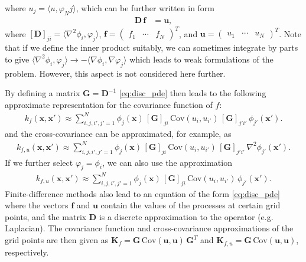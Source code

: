 \documentclass[journal]{IEEEtran}
\begin{document}
%
where $u_j = \langle u, \varphi_Nj\rangle$, which can be further written in form
%
\begin{equation}
\begin{split}
  \mathbf{D} \, \mathbf{f} &= \mathbf{u},
\end{split}
\label{eq:disc_pde}
\end{equation}
%
where $[\mathbf{D}]_{ji} = \langle \nabla^2 \phi_i, \varphi_j \rangle$, $\mathbf{f} = \begin{pmatrix} f_1 & \cdots & f_N \end{pmatrix}^T$, and $\mathbf{u} = \begin{pmatrix} u_1 & \cdots & u_N  \end{pmatrix}^T$. Note that if we define the inner product suitably, we can sometimes integrate by parts to give $\langle \nabla^2 \phi_i, \varphi_j \rangle \to -\langle \nabla \phi_i, \nabla \varphi_j \rangle$ which leads to weak formulations of the problem. However, this aspect is not considered here further.

By defining a matrix $\mathbf{G} = \mathbf{D}^{-1}$ \eqref{eq:disc_pde} then leads to the following approximate representation for the covariance function of $f$:
%
% 
% 
\begin{equation}
\begin{split}
  k_f(\mathbf{x},\mathbf{x}')
  \approx \sum_{i,j,i',j'=1}^N \phi_j(\mathbf{x}) \, [\mathbf{G}]_{ji} \, \mathrm{Cov}(u_i,u_{i'}) \, 
    [\mathbf{G}]_{j'i'} \, \phi_{j'}(\mathbf{x}').
\end{split}
\end{equation}
%
and the cross-covariance can be approximated, for example, as
%
\begin{equation}
\begin{split}
  k_{f,u}(\mathbf{x},\mathbf{x}')
  \approx \sum_{i,j,i',j'=1}^N \phi_j(\mathbf{x}) \, [\mathbf{G}]_{ji} \, \mathrm{Cov}(u_i,u_{i'}) \, 
    [\mathbf{G}]_{j'i'} \, \nabla^2 \phi_{j'}(\mathbf{x}').
\end{split}
\label{eq:pde_kfu}
\end{equation}
%
If we further select $\varphi_j = \phi_i$, we can also use the approximation
%
\begin{equation}
\begin{split}
  k_{f,u}(\mathbf{x},\mathbf{x}')
  \approx \sum_{i,j,i',j'=1}^N \phi_j(\mathbf{x}) \, [\mathbf{G}]_{ji} \, \mathrm{Cov}(u_i,u_{i'}) \, \phi_{j'}(\mathbf{x}').
\end{split}
\label{eq:pde_kfu2}
\end{equation}
%
Finite-difference methods also lead to an equation of the form \eqref{eq:disc_pde} where the vectors $\mathbf{f}$ and $\mathbf{u}$ contain the values of the processes at certain grid points, and the matrix $\mathbf{D}$ is a discrete approximation to the operator (e.g. Laplacian). The covariance function and cross-covariance approximations of the grid points are then given as $\mathbf{K}_f = \mathbf{G} \, \mathrm{Cov}(\mathbf{u},\mathbf{u}) \, \mathbf{G}^T$ and $\mathbf{K}_{f,u} = \mathbf{G} \, \mathrm{Cov}(\mathbf{u},\mathbf{u})$, respectively.
\end{document}
